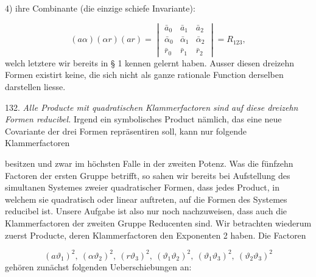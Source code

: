 4) ihre Combinante (die einzige schiefe Invariante):

\[
(a\alpha)(\alpha r)(ar) = \begin{vmatrix} \bar a_0 & \bar a_1 & \bar a_2 \\ \bar\alpha_0 & \bar\alpha_1 & \bar\alpha_2 \\ \bar r_0 & \bar r_1 & \bar r_2 \end{vmatrix} = R_{123},
\]
welch letztere wir bereits in § 1 kennen gelernt haben. Ausser diesen dreizehn
Formen existirt keine, die sich nicht als ganze rationale Function derselben
darstellen liesse.

132. \textit{Alle Producte mit quadratischen Klammerfactoren sind auf diese
dreizehn Formen reducibel.} Irgend ein symbolisches Product nämlich, das eine neue
Covariante der drei Formen repräsentiren soll, kann nur folgende Klammerfactoren


besitzen und zwar im höchsten Falle in der zweiten Potenz. Was die fünfzehn
Factoren der ersten Gruppe betrifft, so sahen wir bereits bei Aufstellung des
simultanen Systemes zweier quadratischer Formen, dass jedes Product, in welchem
sie quadratisch oder linear auftreten, auf die Formen des Systemes reducibel ist.
Unsere Aufgabe ist also nur noch nachzuweisen, dass auch die Klammerfactoren der
zweiten Gruppe Reducenten sind. Wir betrachten wiederum zuerst Producte, deren
Klammerfactoren den Exponenten 2 haben. Die Factoren

\[
(a\vartheta_1)^2,\ (\alpha\vartheta_2)^2,\ (r\vartheta_3)^2,\ (\vartheta_1\vartheta_2)^2,\ (\vartheta_1\vartheta_3)^2,\ (\vartheta_2\vartheta_3)^2
\]
gehören zunächst folgenden Ueberschiebungen an:


